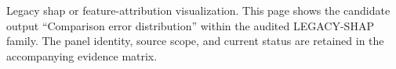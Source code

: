 Legacy shap or feature-attribution visualization. This page shows the candidate output ``Comparison error distribution'' within the audited LEGACY-SHAP family. The panel identity, source scope, and current status are retained in the accompanying evidence matrix.
